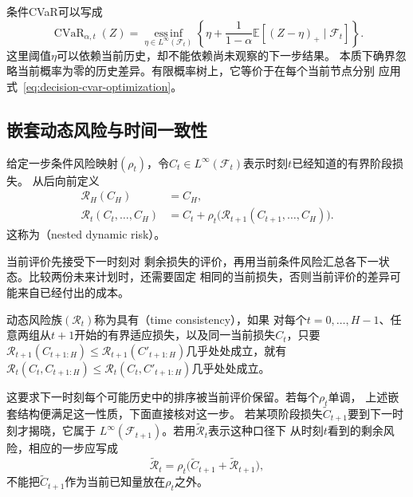 条件CVaR可以写成
\begin{equation}
  \operatorname{CVaR}_{\alpha,t}(Z)
  =
  \operatorname*{ess\,inf}_{\eta\in
    L^\infty(\mathcal{F}_t)}
  \left\{
    \eta+
    \frac{1}{1-\alpha}
    \mathbb{E}[(Z-\eta)_+\mid\mathcal{F}_t]
  \right\}.
  \label{eq:decision-conditional-cvar}
\end{equation}
这里阈值\(\eta\)可以依赖当前历史，却不能依赖尚未观察的下一步结果。
本质下确界忽略当前概率为零的历史差异。有限概率树上，它等价于在每个当前节点分别
应用式~\eqref{eq:decision-cvar-optimization}。

\subsection{嵌套动态风险与时间一致性}
\begin{definition}[嵌套动态风险]
\label{def:decision-nested-dynamic-risk}
给定一步条件风险映射$(\rho_t)$，令\(C_t\in L^\infty(\mathcal{F}_t)\)表示时刻\(t\)已经知道的有界阶段损失。
从后向前定义
\begin{align}
  \mathcal{R}_{H}(C_H)
  &=
  C_H,\\
  \mathcal{R}_{t}(C_t,\ldots,C_H)
  &=
  C_t+
  \rho_t\bigl(
    \mathcal{R}_{t+1}(C_{t+1},\ldots,C_H)
  \bigr).
  \label{eq:decision-nested-dynamic-risk}
\end{align}
这称为（nested dynamic risk）。
\end{definition}
当前评价先接受下一时刻对
剩余损失的评价，再用当前条件风险汇总各下一状态。比较两份未来计划时，还需要固定
相同的当前损失，否则当前评价的差异可能来自已经付出的成本。
\begin{definition}[递归意义下的时间一致性]
\label{def:decision-time-consistency}
动态风险族$(\mathcal R_t)$称为具有（time consistency），如果
对每个$t=0,\ldots,H-1$、任意两组从$t+1$开始的有界适应损失，以及同一当前损失$C_t$，只要
$\mathcal R_{t+1}(C_{t+1:H})\leq\mathcal R_{t+1}(C'_{t+1:H})$几乎处处成立，就有
$\mathcal R_t(C_t,C_{t+1:H})\leq\mathcal R_t(C_t,C'_{t+1:H})$几乎处处成立。
\end{definition}
这要求下一时刻每个可能历史中的排序被当前评价保留。若每个$\rho_t$单调，
上述嵌套结构便满足这一性质，下面直接核对这一步。
若某项阶段损失\(\widetilde C_{t+1}\)要到下一时刻才揭晓，它属于
\(L^\infty(\mathcal{F}_{t+1})\)。若用\(\widetilde{\mathcal{R}}_t\)表示这种口径下
从时刻\(t\)看到的剩余风险，相应的一步应写成
\[
  \widetilde{\mathcal{R}}_t
  =
  \rho_t\bigl(
    \widetilde C_{t+1}+\widetilde{\mathcal{R}}_{t+1}
  \bigr),
\]
不能把\(\widetilde C_{t+1}\)作为当前已知量放在\(\rho_t\)之外。

